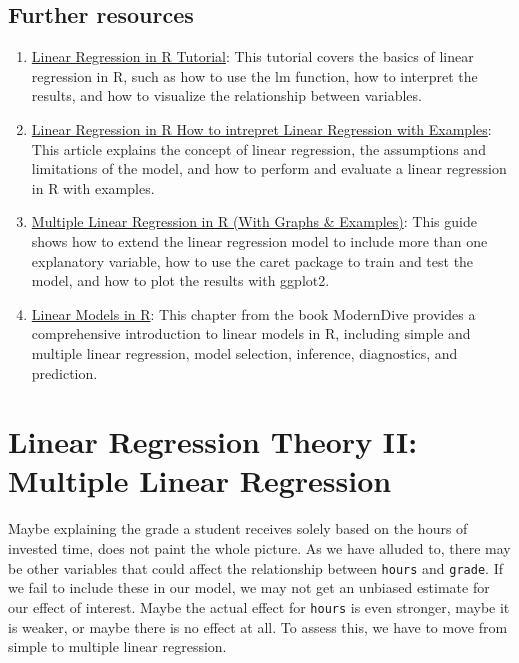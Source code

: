 \documentclass[
]{book}
\providecommand{\tightlist}{%
  \setlength{\itemsep}{0pt}\setlength{\parskip}{0pt}}
\begin{document}
\hypertarget{further-resources-2}{%
\section{Further resources}\label{further-resources-2}}

\begin{enumerate}
\def\labelenumi{\arabic{enumi}.}
\tightlist
\item
  \href{https://www.datacamp.com/tutorial/linear-regression-R}{Linear Regression in R Tutorial}: This tutorial covers the basics of linear regression in R, such as how to use the lm function, how to interpret the results, and how to visualize the relationship between variables.
\item
  \href{https://www.educba.com/linear-regression-in-r/}{Linear Regression in R \textbar{} How to intrepret Linear Regression with Examples}: This article explains the concept of linear regression, the assumptions and limitations of the model, and how to perform and evaluate a linear regression in R with examples.
\item
  \href{https://www.upgrad.com/blog/multiple-linear-regression-in-r/}{Multiple Linear Regression in R (With Graphs \& Examples)}: This guide shows how to extend the linear regression model to include more than one explanatory variable, how to use the caret package to train and test the model, and how to plot the results with ggplot2.
\item
  \href{https://moderndive.com/5-regression.html\#model1table}{Linear Models in R}: This chapter from the book ModernDive provides a comprehensive introduction to linear models in R, including simple and multiple linear regression, model selection, inference, diagnostics, and prediction.
\end{enumerate}

\hypertarget{lin-t-2}{%
\chapter{Linear Regression Theory II: Multiple Linear Regression}\label{lin-t-2}}

Maybe explaining the grade a student receives solely based on the hours of
invested time, does not paint the whole picture. As we have alluded to, there
may be other variables that could affect the relationship between \texttt{hours} and
\texttt{grade}.
If we fail to include these in our model, we may not get an unbiased estimate
for our effect of interest. Maybe the actual effect for \texttt{hours} is even stronger,
maybe it is weaker, or maybe there is no effect at all.
To assess this, we have to move from simple to multiple linear regression.
\end{document}
